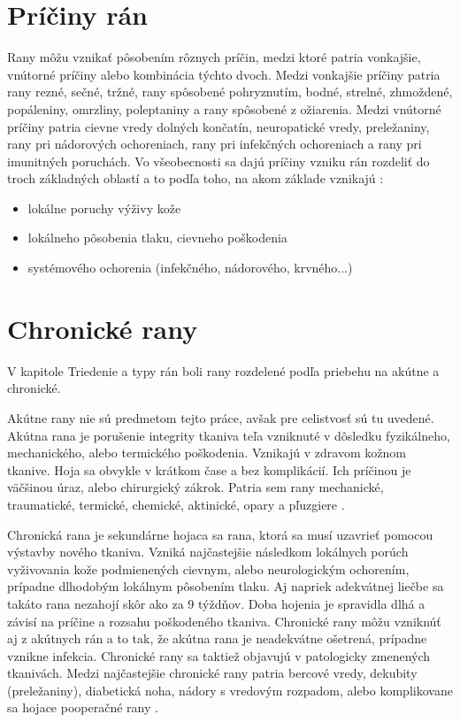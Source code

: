 \section{Príčiny rán}
Rany môžu vznikať pôsobením rôznych príčin, medzi ktoré patria vonkajšie, vnútorné príčiny alebo kombinácia týchto dvoch. Medzi vonkajšie príčiny patria rany rezné, sečné, tržné, rany spôsobené pohryznutím, bodné, strelné, zhmoždené, popáleniny, omrzliny, poleptaniny a rany spôsobené z ožiarenia. Medzi vnútorné príčiny patria cievne vredy dolných končatín, neuropatické vredy, preležaniny, rany pri nádorových ochoreniach, rany pri infekčných ochoreniach a rany pri imunitných poruchách. Vo všeobecnosti sa dajú príčiny vzniku rán rozdeliť do troch základných oblastí a to podľa toho, na akom základe vznikajú \cite{Hlinkova2015}:
\begin{itemize} 
\item lokálne poruchy výživy kože
\item lokálneho pôsobenia tlaku, cievneho poškodenia
\item systémového ochorenia (infekčného, nádorového, krvného...)
\end{itemize}

\section{Chronické rany}
V kapitole Triedenie a typy rán boli rany rozdelené podľa priebehu na akútne a chronické. 

Akútne rany nie sú predmetom tejto práce, avšak pre celistvosť sú tu uvedené. Akútna rana je porušenie integrity tkaniva teľa vzniknuté v dôsledku fyzikálneho, mechanického, alebo termického poškodenia. Vznikajú v zdravom kožnom tkanive. Hoja sa obvykle v krátkom čase a bez komplikácií. Ich príčinou je väčšinou úraz, alebo chirurgický zákrok. Patria sem rany mechanické, traumatické, termické, chemické, aktinické, opary a pľuzgiere \cite{pcCdSrbbhhlr5YcQ}.

Chronická rana je sekundárne hojaca sa rana, ktorá sa musí uzavrieť pomocou výstavby nového tkaniva. Vzniká najčastejšie následkom lokálnych porúch vyživovania kože podmienených cievnym, alebo neurologickým ochorením, prípadne dlhodobým lokálnym pôsobením tlaku. Aj napriek adekvátnej liečbe sa takáto rana nezahojí skôr ako za 9 týždňov. Doba hojenia je spravidla dlhá a závisí na príčine a rozsahu poškodeného tkaniva. Chronické rany môžu vzniknúť aj z akútnych rán a to tak, že akútna rana je neadekvátne ošetrená, prípadne vznikne infekcia. Chronické rany sa taktiež objavujú v patologicky zmenených tkanivách. Medzi najčastejšie chronické rany patria bercové vredy, dekubity (preležaniny), diabetická noha, nádory s vredovým rozpadom, alebo komplikovane sa hojace pooperačné rany \cite{Hlinkova2015}.

